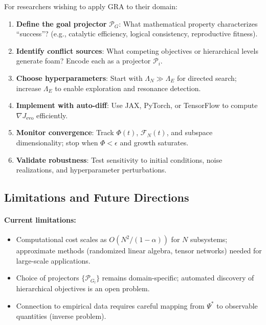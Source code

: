 \documentclass[11pt,a4paper]{article}
\theoremstyle{plain}
\theoremstyle{definition}
\theoremstyle{remark}
\newcommand{\Foam}{\Phi}
\newcommand{\Projector}{\mathcal{P}}
\newcommand{\Functional}{\mathcal{F}}
\newcommand{\grad}{\nabla}
\begin{document}
For researchers wishing to apply GRA to their domain:

\begin{enumerate}[label=\textbf{Step \arabic*:}, leftmargin=*]
    \item \textbf{Define the goal projector} $\Projector_G$: What mathematical property characterizes ``success''? (e.g., catalytic efficiency, logical consistency, reproductive fitness).
    
    \item \textbf{Identify conflict sources}: What competing objectives or hierarchical levels generate foam? Encode each as a projector $\Projector_i$.
    
    \item \textbf{Choose hyperparameters}: Start with $\Lambda_N \gg \Lambda_E$ for directed search; increase $\Lambda_E$ to enable exploration and resonance detection.
    
    \item \textbf{Implement with auto-diff}: Use JAX, PyTorch, or TensorFlow to compute $\grad J_{\text{evo}}$ efficiently.
    
    \item \textbf{Monitor convergence}: Track $\Foam(t)$, $\Functional_N(t)$, and subspace dimensionality; stop when $\Foam < \epsilon$ and growth saturates.
    
    \item \textbf{Validate robustness}: Test sensitivity to initial conditions, noise realizations, and hyperparameter perturbations.
\end{enumerate}

\subsection{Limitations and Future Directions}

\paragraph{Current limitations:}
\begin{itemize}
    \item Computational cost scales as $O(N^2/(1-\alpha))$ for $N$ subsystems; approximate methods (randomized linear algebra, tensor networks) needed for large-scale applications.
    \item Choice of projectors $\{\Projector_{G_l}\}$ remains domain-specific; automated discovery of hierarchical objectives is an open problem.
    \item Connection to empirical data requires careful mapping from $\Psi^*$ to observable quantities (inverse problem).
\end{itemize}
\end{document}
